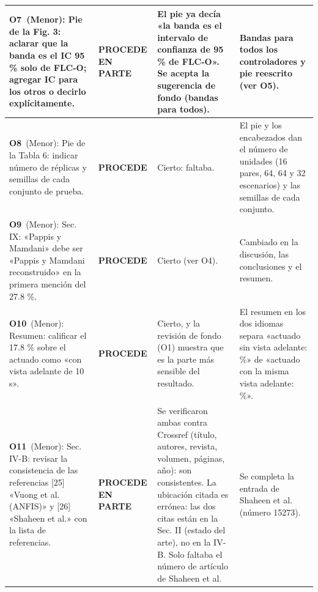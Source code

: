 \begin{longtable}{@{}p{7.4cm}p{2.1cm}p{8.4cm}p{7.3cm}@{}}
\midrule
\textbf{O7}\ (Menor): Pie de la Fig. 3: aclarar que la banda es el IC 95 \% solo de FLC-O; agregar IC para los otros o decirlo explícitamente.\par\smallskip{\itshape Ubicaci\'on citada: Fig. 3, pie} & \cellcolor{okamarillo}\textbf{PROCEDE EN PARTE} & El pie ya decía «la banda es el intervalo de confianza de 95 \% de FLC-O». Se acepta la sugerencia de fondo (bandas para todos). & Bandas para todos los controladores y pie reescrito (ver O5).\par\smallskip{\itshape Queda en: Fig. 4 (p. 9)} \\
\midrule
\textbf{O8}\ (Menor): Pie de la Tabla 6: indicar número de réplicas y semillas de cada conjunto de prueba.\par\smallskip{\itshape Ubicaci\'on citada: Tabla 6, pie} & \cellcolor{okverde}\textbf{PROCEDE} & Cierto: faltaba. & El pie y los encabezados dan el número de unidades (16 pares, 64, 64 y 32 escenarios) y las semillas de cada conjunto.\par\smallskip{\itshape Queda en: Tabla 6 (p. 11); Sec. VII (p. 7)} \\
\midrule
\textbf{O9}\ (Menor): Sec. IX: «Pappis y Mamdani» debe ser «Pappis y Mamdani reconstruido» en la primera mención del 27.8 \%.\par\smallskip{\itshape Ubicaci\'on citada: Sec. IX} & \cellcolor{okverde}\textbf{PROCEDE} & Cierto (ver O4). & Cambiado en la discusión, las conclusiones y el resumen.\par\smallskip{\itshape Queda en: Sec. IX (p. 8); Sec. X (p. 10)} \\
\midrule
\textbf{O10}\ (Menor): Resumen: calificar el 17.8 \% sobre el actuado como «con vista adelante de 10 s».\par\smallskip{\itshape Ubicaci\'on citada: Abstract} & \cellcolor{okverde}\textbf{PROCEDE} & Cierto, y la revisión de fondo (O1) muestra que es la parte más sensible del resultado. & El resumen en los dos idiomas separa «actuado sin vista adelante: \RedActAfOf{} \%» de «actuado con la misma vista adelante: \RedActVOf{} \%».\par\smallskip{\itshape Queda en: Sec. VIII-A (p. 8)} \\
\midrule
\textbf{O11}\ (Menor): Sec. IV-B: revisar la consistencia de las referencias [25] «Vuong et al. (ANFIS)» y [26] «Shaheen et al.» con la lista de referencias.\par\smallskip{\itshape Ubicaci\'on citada: Sec. IV-B} & \cellcolor{okamarillo}\textbf{PROCEDE EN PARTE} & Se verificaron ambas contra Crossref (título, autores, revista, volumen, páginas, año): son consistentes. La ubicación citada es errónea: las dos citas están en la Sec. II (estado del arte), no en la IV-B. Solo faltaba el número de artículo de Shaheen et al. & Se completa la entrada de Shaheen et al. (número 15273).\par\smallskip{\itshape Queda en: Sec. II (p. 2)} \\

\end{longtable}
